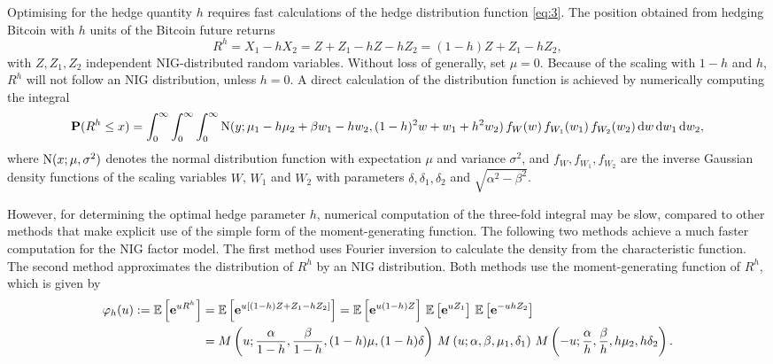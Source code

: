 Optimising for the hedge quantity $h$ requires fast calculations of
the hedge distribution function \eqref{eq:3}. The position obtained
from hedging Bitcoin with $h$ units of the Bitcoin future returns
\begin{equation*}
  R^h = X_1 - h X_2 = Z + Z_1 - h Z - h Z_2 = (1-h) Z + Z_1 - h Z_2,
\end{equation*}
with $Z, Z_1, Z_2$ independent NIG-distributed random
variables. Without loss of generally, set $\mu=0$. Because of the
scaling with $1-h$ and $h$, $R^h$ will not follow an NIG distribution,
unless $h=0$.  A direct calculation of the distribution function is
achieved by numerically computing the integral
\begin{equation*}
  {\bf P}(R^h\leq x) = \int_0^\infty \int_0^\infty \int_0^\infty
  {\rm N}(y; \mu_1 - h \mu_2 + \beta w_1 - h w_2, (1-h)^2 w + w_1 + h^2
  w_2)\, f_W(w)\, f_{W_1}(w_1)\, f_{W_2} (w_2)\, {\rm d} w\, {\rm d} w_1\, {\rm d} w_2,
\end{equation*}
where ${\rm N}(x; \mu, \sigma^2)$ denotes the normal distribution
function with expectation $\mu$ and variance $\sigma^2$, and
$f_W, f_{W_1}, f_{W_2}$ are the inverse Gaussian density functions of the
scaling variables $W$, $W_1$ and $W_2$ with parameters
$\delta, \delta_1, \delta_2$ and $\sqrt{\alpha^2-\beta^2}$. 

However, for determining the optimal hedge parameter $h$, numerical
computation of the three-fold integral may be slow, compared to other
methods that make explicit use of the simple form of the
moment-generating function.  The following two methods achieve a much
faster computation for the NIG factor model.  The first method uses
Fourier inversion to calculate the density from the characteristic
function. The second method approximates the distribution of $R^h$ by
an NIG distribution.  Both methods use the moment-generating function
of $R^h$, which is given by
\begin{align}
  \varphi_h(u):=\E\left[\e^{u R^h}\right]
  &= \E\left[ \e^{u[(1-h) Z + Z_1 -h Z_2]}\right] %
    = \E\left[ \e^{u(1-h) Z}\right]\, \E\left[ \e^{u Z_1}\right] \,
    \E\left[ \e^{-u h Z_2}\right]\nonumber\\
  &=M\left(u;\frac{\alpha}{1-h}, \frac{\beta}{1-h}, (1-h)\mu,
    (1-h)\delta\right)\,
    M\left(u; \alpha, \beta, \mu_1, \delta_1\right)\,
    M\left(-u; \frac{\alpha}{h}, \frac{\beta}{h}, h\mu_2,
    h\delta_2\right).
    \label{eq:7}
\end{align}



